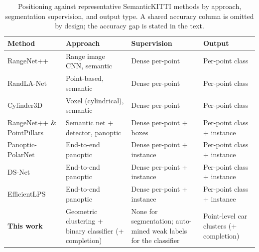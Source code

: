 \begin{table}[H]
  \centering
  \caption[Positioning against representative SemanticKITTI methods]{Positioning
    against representative SemanticKITTI methods by approach, segmentation supervision,
    and output type. A shared accuracy column is omitted by design; the accuracy gap is
    stated in the text.}
  \label{tab:positioning}
  \small
  \renewcommand{\arraystretch}{1.25}
  \setlength{\tabcolsep}{5pt}
  \begin{tabular}{@{}L{3.2cm}L{4.1cm}L{4.0cm}L{3.6cm}@{}}
    \toprule
    Method & Approach & Supervision & Output \\
    \midrule
    RangeNet++~\cite{milioto2019rangenet++} & Range image CNN, semantic & Dense per-point & Per-point class \\
    RandLA-Net~\cite{Hu_2020_CVPR} & Point-based, semantic & Dense per-point & Per-point class \\
    Cylinder3D~\cite{zhu2021cylindrical} & Voxel (cylindrical), semantic & Dense per-point & Per-point class \\
    \addlinespace[2pt]
    RangeNet++ \& PointPillars~\cite{behley2021panoptic} & Semantic net + detector, panoptic & Dense per-point + boxes & Per-point class + instance \\
    Panoptic-PolarNet~\cite{zhou2021panopticpolarnet} & End-to-end panoptic & Dense per-point + instance & Per-point class + instance \\
    DS-Net~\cite{hong2021dsnet} & End-to-end panoptic & Dense per-point + instance & Per-point class + instance \\
    EfficientLPS~\cite{sirohi2021efficientlps} & End-to-end panoptic & Dense per-point + instance & Per-point class + instance \\
    \midrule
    \textbf{This work} & Geometric clustering + binary classifier (+ completion) & None for segmentation; auto-mined weak labels for the classifier & Point-level car clusters (+ completion) \\
    \bottomrule
  \end{tabular}
\end{table}

